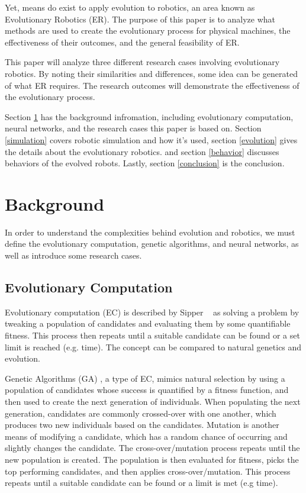 \documentclass{sig-alternate}
\begin{document}
 Yet, means do exist to apply evolution to robotics, an area known as Evolutionary Robotics (ER). The purpose of this paper is to analyze what methods are used to create the evolutionary process for physical machines, the effectiveness of their outcomes, and the general feasibility of ER.
 
 This paper will analyze three different research cases involving evolutionary robotics. By noting their similarities and differences, some idea can be generated of what ER requires. The research outcomes will demonstrate the effectiveness of the evolutionary process.

   Section \ref{background}  has the background infromation, including evolutionary computation, neural networks, and the research cases this paper is based on. Section \ref{simulation} covers robotic simulation and how it's used, section \ref{evolution} gives the details about the evolutionary robotics. and section \ref{behavior} discusses behaviors of the evolved robots. Lastly, section \ref{conclusion} is the conclusion.
 
 
\section{Background}\label{background}
In order to understand the complexities behind evolution and robotics, we must define the evolutionary computation, genetic algorithms,  and neural networks, as well as introduce some research cases.

 \subsection{Evolutionary Computation}\label{background EC}
  Evolutionary computation (EC) is described by Sipper ~\cite{Sipper2011Win} as solving a problem by tweaking a population of candidates and evaluating them by some quantifiable fitness. This process then repeats until a suitable candidate can be found or a set limit is reached (e.g. time). The concept can be compared to natural genetics and evolution.
  
  Genetic Algorithms (GA) \cite{wiki:GeneticAlgorithms}, a type of EC, mimics natural selection by using a population of candidates whose success is quantified by a fitness function, and then used to create the next generation of individuals. When populating the next generation, candidates are commonly crossed-over with one another, which produces two new individuals based on the candidates. Mutation is another means of modifying a candidate, which has a random chance of occurring and slightly changes the candidate. The cross-over/mutation process repeats until the new population is created. The population is then evaluated for fitness, picks the top performing candidates, and then applies cross-over/mutation. This process  repeats until a suitable candidate can be found or a limit is met (e.g time).
  
\end{document}
